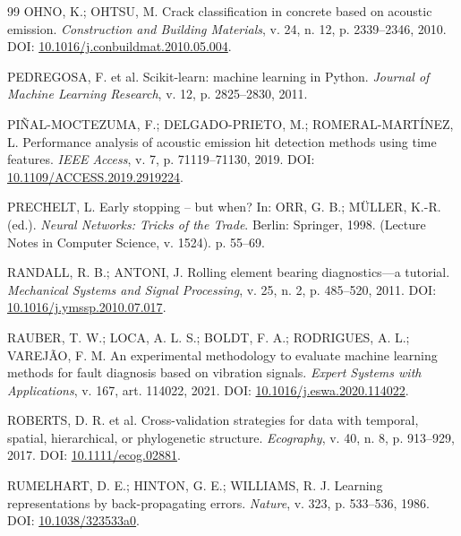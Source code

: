 \documentclass[12pt]{article}
\begin{document}
{\begin{thebibliography}{99}
	OHNO, K.; OHTSU, M.
	\newblock Crack classification in concrete based on acoustic emission.
	\newblock \emph{Construction and Building Materials}, v. 24, n. 12, p. 2339--2346, 2010.
	\newblock DOI: \href{https://doi.org/10.1016/j.conbuildmat.2010.05.004}{10.1016/j.conbuildmat.2010.05.004}.

	PEDREGOSA, F. et al.
	\newblock Scikit-learn: machine learning in Python.
	\newblock \emph{Journal of Machine Learning Research}, v. 12, p. 2825--2830, 2011.

	PIÑAL-MOCTEZUMA, F.; DELGADO-PRIETO, M.; ROMERAL-MARTÍNEZ, L.
	\newblock Performance analysis of acoustic emission hit detection methods using time features.
	\newblock \emph{IEEE Access}, v. 7, p. 71119--71130, 2019.
	\newblock DOI: \href{https://doi.org/10.1109/ACCESS.2019.2919224}{10.1109/ACCESS.2019.2919224}.

	PRECHELT, L.
	\newblock Early stopping -- but when?
	\newblock In: ORR, G. B.; MÜLLER, K.-R. (ed.). \emph{Neural Networks: Tricks of the Trade}.
	\newblock Berlin: Springer, 1998. (Lecture Notes in Computer Science, v. 1524). p. 55--69.

	RANDALL, R. B.; ANTONI, J.
	\newblock Rolling element bearing diagnostics---a tutorial.
	\newblock \emph{Mechanical Systems and Signal Processing}, v. 25, n. 2, p. 485--520, 2011.
	\newblock DOI: \href{https://doi.org/10.1016/j.ymssp.2010.07.017}{10.1016/j.ymssp.2010.07.017}.

	RAUBER, T. W.; LOCA, A. L. S.; BOLDT, F. A.; RODRIGUES, A. L.; VAREJÃO, F. M.
	\newblock An experimental methodology to evaluate machine learning methods for fault diagnosis based on vibration signals.
	\newblock \emph{Expert Systems with Applications}, v. 167, art. 114022, 2021.
	\newblock DOI: \href{https://doi.org/10.1016/j.eswa.2020.114022}{10.1016/j.eswa.2020.114022}.

	ROBERTS, D. R. et al.
	\newblock Cross-validation strategies for data with temporal, spatial, hierarchical, or phylogenetic structure.
	\newblock \emph{Ecography}, v. 40, n. 8, p. 913--929, 2017.
	\newblock DOI: \href{https://doi.org/10.1111/ecog.02881}{10.1111/ecog.02881}.

	RUMELHART, D. E.; HINTON, G. E.; WILLIAMS, R. J.
	\newblock Learning representations by back-propagating errors.
	\newblock \emph{Nature}, v. 323, p. 533--536, 1986.
	\newblock DOI: \href{https://doi.org/10.1038/323533a0}{10.1038/323533a0}.


\end{thebibliography}}
\end{document}
